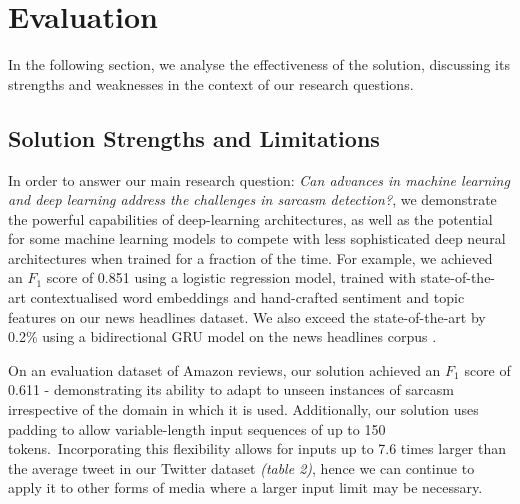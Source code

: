 \documentclass[12pt,a4paper]{article}
\begin{document}
\section{Evaluation}
\noindent In the following section, we analyse the effectiveness of the solution, discussing its strengths and weaknesses in the context of our research questions. 


\subsection{Solution Strengths and Limitations}\vspace{-10pt}
\noindent In order to answer our main research question: \textit{Can advances in machine learning and deep learning address the challenges in sarcasm detection?}, we demonstrate the powerful capabilities of deep-learning architectures, as well as the potential for some machine learning models to compete with less sophisticated deep neural architectures when trained for a fraction of the time. For example, we achieved an $F_1$ score of 0.851 using a logistic regression model, trained with state-of-the-art contextualised word embeddings and hand-crafted sentiment and topic features on our news headlines dataset. We also exceed the state-of-the-art by 0.2\% using a bidirectional GRU model on the news headlines corpus \cite{misra2019sarcasm}.



 On an evaluation dataset of Amazon reviews, our solution achieved an $F_1$ score of 0.611 - demonstrating its ability to adapt to unseen instances of sarcasm irrespective of the domain in which it is used. Additionally, our solution uses padding to allow variable-length input sequences of up to 150 tokens.\ Incorporating this flexibility allows for inputs up to 7.6 times larger than the average tweet in our Twitter dataset \textit{(table 2)}, hence we can continue to apply it to other forms of media where a larger input limit may be necessary.
\end{document}
